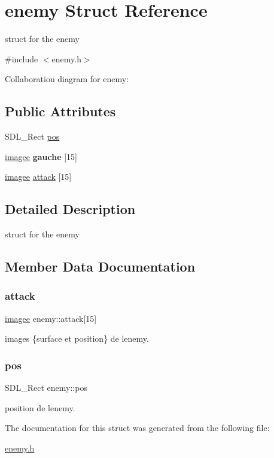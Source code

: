 \hypertarget{structenemy}{}\section{enemy Struct Reference}
\label{structenemy}


struct for the enemy  




{\ttfamily \#include $<$enemy.\+h$>$}



Collaboration diagram for enemy\+:
\subsection*{Public Attributes}
\begin{DoxyCompactItemize}
\item 
S\+D\+L\+\_\+\+Rect \hyperlink{structenemy_a5e20423f2b9f4d4c62982d2de39cfb66}{pos}
\item 
\mbox{\label{structenemy_a504a17cb154d333470cee30fa8e88763}} 
\hyperlink{structimagee}{imagee} {\bfseries gauche} \mbox{[}15\mbox{]}
\item 
\hyperlink{structimagee}{imagee} \hyperlink{structenemy_ad5dd068b74cc7ea960263716a999067d}{attack} \mbox{[}15\mbox{]}
\end{DoxyCompactItemize}


\subsection{Detailed Description}
struct for the enemy 

\subsection{Member Data Documentation}
\mbox{\label{structenemy_ad5dd068b74cc7ea960263716a999067d}} 
\subsubsection{\texorpdfstring{attack}{attack}}
{\footnotesize\ttfamily \hyperlink{structimagee}{imagee} enemy\+::attack\mbox{[}15\mbox{]}}

images \{surface et position\} de l\textquotesingle{}enemy. \mbox{\label{structenemy_a5e20423f2b9f4d4c62982d2de39cfb66}} 
\subsubsection{\texorpdfstring{pos}{pos}}
{\footnotesize\ttfamily S\+D\+L\+\_\+\+Rect enemy\+::pos}

position de l\textquotesingle{}enemy. 

The documentation for this struct was generated from the following file\+:\begin{DoxyCompactItemize}
\item 
\hyperlink{enemy_8h}{enemy.\+h}\end{DoxyCompactItemize}
